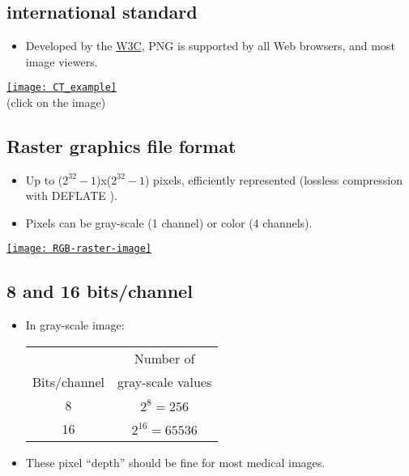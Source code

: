 \chapter{}

\section{ international standard}
\begin{itemize}
\item Developed by the \href{https://www.w3.org/}{W3C}, \gls{PNG} \cite{roelofs1999png} is
  supported by all Web browsers, and most image viewers.
\end{itemize}
\begin{center}
  \href{https://upload.wikimedia.org/wikipedia/commons/0/05/CT_of_a_normal_abdomen_and_pelvis%2C_coronal_plane_79.png}{\texttt{[image: CT\_example]}}\\
     (click on the image)
\end{center}

\section{Raster graphics file format}
\begin{itemize}
\item Up to ($2^{32}-1$)x($2^{32}-1$) pixels, efficiently represented
  (lossless compression with DEFLATE \cite{deutsch1996deflate}).
\item Pixels can be gray-scale (1 channel) or color
   (4 channels).
\end{itemize}
\vspace{-4ex}
\begin{center}
  \href{https://en.wikipedia.org/wiki/Raster_graphics}{\texttt{[image: RGB-raster-image]}}
\end{center}

\section{8 and 16 bits/channel}
\begin{itemize}
\item In gray-scale image:
  \begin{center}
    \begin{tabular}{c|c}
      & Number of \\
      Bits/channel & gray-scale values \\
      \hline
      8 & $2^8=256$ \\
      16 & $2^{16}=65536$
    \end{tabular}
  \end{center}
\item These pixel ``depth'' should be fine for most medical images.
\end{itemize}

